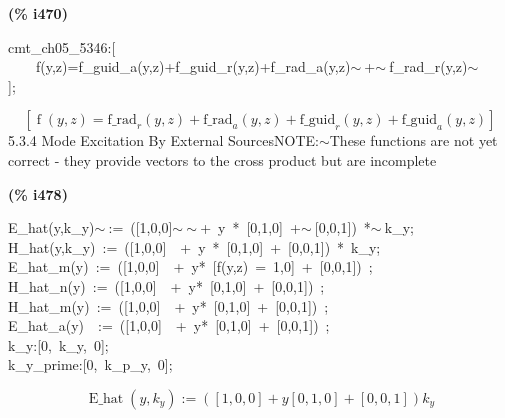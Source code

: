 \documentclass[fleqn]{article}
\begin{document}
\noindent
\begin{minipage}[t]{4.000000em}\color{red}\bfseries
(\% i470)	
\end{minipage}
\begin{minipage}[t]{\textwidth}\color{blue}
cmt\_ch05\_5346:[\\
\ \ \ \ f(y,z)=f\_guid\_a(y,z)+f\_guid\_r(y,z)+f\_rad\_a(y,z)\ensuremath{\sim\ }+\ensuremath{\sim\ }f\_rad\_r(y,z)\ensuremath{\sim\ }\\
];
\end{minipage}
\[\displaystyle \tag{\% o470} 
\left[ \operatorname{f}\left( y\operatorname{,}z\right) ={{\ensuremath{\mathrm{f\_ rad}}}_r}\left( y\operatorname{,}z\right) +{{\ensuremath{\mathrm{f\_ rad}}}_a}\left( y\operatorname{,}z\right) +{{\ensuremath{\mathrm{f\_ guid}}}_r}\left( y\operatorname{,}z\right) +{{\ensuremath{\mathrm{f\_ guid}}}_a}\left( y\operatorname{,}z\right) \right] \mbox{}
\]
5.3.4   Mode Excitation By External SourcesNOTE:\ensuremath{\sim }These functions are not yet correct - they provide vectors to the cross product but are incomplete


\noindent
\begin{minipage}[t]{4.000000em}\color{red}\bfseries
(\% i478)	
\end{minipage}
\begin{minipage}[t]{\textwidth}\color{blue}
E\_hat(y,k\_y)\ensuremath{\sim\ }:=\ ([1,0,0]\ensuremath{\sim\ }\ensuremath{\sim\ }+\ y\ *\ [0,1,0]\ +\ensuremath{\sim\ }[0,0,1])\ *\ensuremath{\sim\ }k\_y;\\
H\_hat(y,k\_y)\ :=\ ([1,0,0]\ \ +\ y\ *\ [0,1,0]\ +\ [0,0,1])\ *\ k\_y;\\
E\_hat\_m(y)\ :=\ ([1,0,0]\ \ +\ y*\ [f(y,z)\ =\ 1,0]\ +\ [0,0,1])\ ;\\
H\_hat\_n(y)\ :=\ ([1,0,0]\ \ +\ y*\ [0,1,0]\ +\ [0,0,1])\ ;\\
H\_hat\_m(y)\ :=\ ([1,0,0]\ \ +\ y*\ [0,1,0]\ +\ [0,0,1])\ ;\\
E\_hat\_a(y)\ \ :=\ ([1,0,0]\ \ +\ y*\ [0,1,0]\ +\ [0,0,1])\ ;\\
k\_y:[0,\ k\_y,\ 0];\\
k\_y\_prime:[0,\ k\_p\_y,\ 0];
\end{minipage}
\[\displaystyle \tag{\% o471} 
\operatorname{E\_ hat}\left( y\operatorname{,}{k_y}\right) \operatorname{:=}\left( \left[ 1\operatorname{,}0\operatorname{,}0\right] +y \left[ 0\operatorname{,}1\operatorname{,}0\right] +\left[ 0\operatorname{,}0\operatorname{,}1\right] \right)  {k_y}\mbox{}\]
\end{document}
